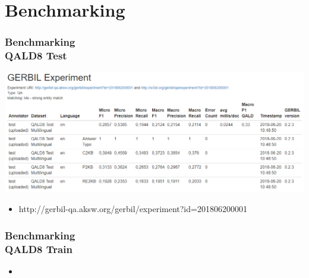 \documentclass{beamer}
\begin{document}
\section{Benchmarking}

\begin{frame}
\frametitle{Benchmarking \\ {\normalsize QALD8 Test}}
\begin{center}
	\includegraphics[scale=0.38]{QALD-8-Test.PNG}
\end{center}

\begin{itemize}
	\item  http://gerbil-qa.aksw.org/gerbil/experiment?id=201806200001	
\end{itemize}
\end{frame}

\begin{frame}
\frametitle{Benchmarking \\ {\normalsize QALD8 Train}}
\begin{center}

\end{center}

\begin{itemize}
	\item  
\end{itemize}
\end{frame}
\end{document}
